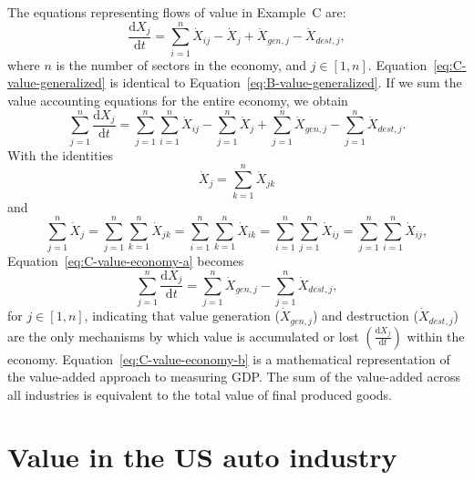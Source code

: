 The equations representing flows of value in Example~C are:
%
\begin{equation}\label{eq:C-value-generalized}
	\frac{\mathrm{d}X_{j}}{\mathrm{d}t}
	= \sum\limits_{i=1}^{n} \dot{X}_{ij}
	- \dot{X}_{j}
	+ \dot{X}_{gen,j}
	- \dot{X}_{dest,j},
\end{equation}
%
where $n$ is the number of sectors in the economy, and $j \in [1, n]$.
Equation~\ref{eq:C-value-generalized} is identical to Equation~\ref{eq:B-value-generalized}.
If we sum the value accounting equations for the entire economy, 
we obtain
%
\begin{equation}\label{eq:C-value-economy-a}
	\sum\limits_{j=1}^{n} \frac{\mathrm{d}X_{j}}{\mathrm{d}t}
	= \sum\limits_{j=1}^{n} \sum\limits_{i=1}^{n} \dot{X}_{ij}
	- \sum\limits_{j=1}^{n} \dot{X}_{j}
	+ \sum\limits_{j=1}^{n} \dot{X}_{gen,j}
	- \sum\limits_{j=1}^{n} \dot{X}_{dest,j}.
\end{equation}
%
With the identities
%
\begin{equation} \label{eq:X_identity_1}
	\dot{X}_{j}  
	= \sum\limits_{k=1}^n \dot{X}_{jk}
\end{equation}
%
and
%
\begin{equation} \label{eq:X_identity_2}
	\sum\limits_{j=1}^n\dot{X}_{j}  
	= \sum\limits_{j=1}^n \sum\limits_{k=1}^n \dot{X}_{jk}
	= \sum\limits_{i=1}^n \sum\limits_{k=1}^n \dot{X}_{ik}
	= \sum\limits_{i=1}^n \sum\limits_{j=1}^n \dot{X}_{ij}
	= \sum\limits_{j=1}^n \sum\limits_{i=1}^n \dot{X}_{ij},
\end{equation}
%
Equation~\ref{eq:C-value-economy-a} becomes
%
\begin{equation}\label{eq:C-value-economy-b}
	\sum\limits_{j=1}^{n} \frac{\mathrm{d}X_{j}}{\mathrm{d}t}
	= \sum\limits_{j=1}^{n} \dot{X}_{gen,j}
	- \sum\limits_{j=1}^{n} \dot{X}_{dest,j},
\end{equation}
%
for $j \in [1, n]$, indicating that 
value generation ($\dot{X}_{gen,j}$) 
and destruction ($\dot{X}_{dest,j}$)
are the only mechanisms by which value is accumulated or lost
$\left( \frac{\mathrm{d}X_{j}}{\mathrm{d}t} \right)$
within the economy.  
Equation~\ref{eq:C-value-economy-b} is a mathematical representation of the
value-added approach to measuring GDP\@. The sum of the
value-added across all industries is equivalent to the 
total value of final produced goods.\cite[p.~196]{Landefeld:2008aa}


\section{Value in the US auto industry}
\label{sec:value_auto}

